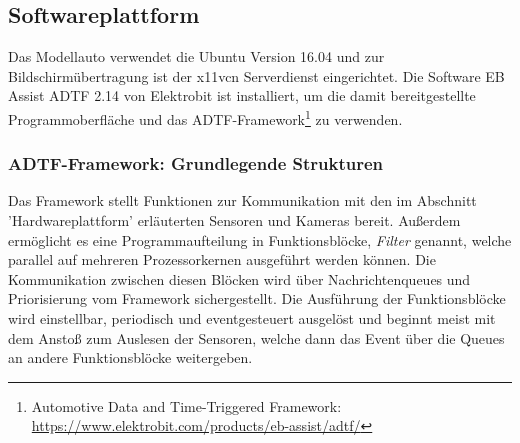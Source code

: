 \documentclass[12pt, a4paper]{scrartcl}
\begin{document}

\subsection{Softwareplattform}
Das Modellauto verwendet die Ubuntu Version 16.04 und zur Bildschirmübertragung ist der x11vcn Serverdienst eingerichtet. Die Software EB Assist ADTF 2.14 von Elektrobit ist installiert, um die damit bereitgestellte Programmoberfläche und das ADTF-Framework\footnote{Automotive Data and Time-Triggered Framework: \url{https://www.elektrobit.com/products/eb-assist/adtf/}} zu verwenden.

\subsubsection{ADTF-Framework: Grundlegende Strukturen}
 Das Framework stellt Funktionen zur Kommunikation mit den im Abschnitt 'Hardwareplattform' erläuterten Sensoren und Kameras bereit. Außerdem ermöglicht es eine Programmaufteilung in Funktionsblöcke, \emph{Filter} genannt, welche parallel auf mehreren Prozessorkernen ausgeführt werden können. Die Kommunikation zwischen diesen Blöcken wird über Nachrichtenqueues und Priorisierung vom Framework sichergestellt. Die Ausführung der Funktionsblöcke wird einstellbar, periodisch und eventgesteuert ausgelöst und beginnt meist mit dem Anstoß zum Auslesen der Sensoren, welche dann das Event über die Queues an andere Funktionsblöcke weitergeben.
\end{document}
